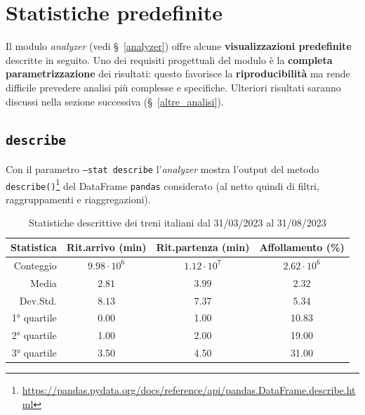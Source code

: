 \documentclass[12pt,italian]{report}
\begin{document}
\section{Statistiche predefinite}

Il modulo \textit{analyzer} (vedi \S~\ref{analyzer}) offre alcune
\textbf{visualizzazioni predefinite} descritte in seguito.  Uno dei
requisiti progettuali del modulo è la \textbf{completa
    parametrizzazione} dei risultati: questo favorisce la
\textbf{riproducibilità} ma rende difficile prevedere analisi più
complesse e specifiche.  Ulteriori risultati saranno discussi nella
sezione successiva (\S~\ref{altre_analisi}).

\subsection{\texttt{describe}}
\label{stat_describe}

Con il parametro \texttt{--stat describe} l'\textit{analyzer} mostra
l'output del metodo
\texttt{describe()}\footnote{\href{https://pandas.pydata.org/docs/reference/api/pandas.DataFrame.describe.html}{https://pandas.pydata.org/docs/reference/api/pandas.DataFrame.describe.html}}
del DataFrame \texttt{pandas} considerato (al netto quindi di filtri,
raggruppamenti e riaggregazioni).


\begin{table}[h]
    \begin{tabular}{r|ccc}
      \textbf{Statistica} & \textbf{Rit.\@ arrivo} (min) & \textbf{Rit.\@ partenza} (min) & \textbf{Affollamento} (\%)
      \\ \hline Conteggio & $9.98 \cdot 10^6$ & $1.12 \cdot 10^7$  & $2.62 \cdot 10^6$
      \\ Media & $2.81$ & $3.99$ & $2.32$
      \\ Dev.\@ Std.\@ & $8.13$ & $7.37$ & $5.34$
      \\ 1° quartile & 0.00 & 1.00 & 10.83
      \\ 2° quartile & 1.00 & 2.00 & 19.00
      \\ 3° quartile & 3.50 & 4.50 & 31.00 
    \end{tabular}
    \caption{Statistiche descrittive dei treni italiani dal 31/03/2023
        al 31/08/2023}
    \label{table:describe}
\end{table}
\end{document}
